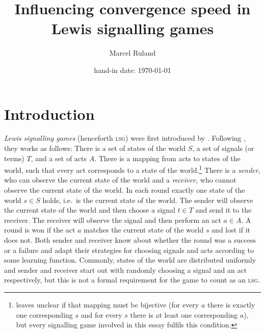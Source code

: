 \documentclass[
	DIV=calc,
	BCOR=0mm,
	pagesize,
]{scrartcl}
\title{Influencing convergence speed in Lewis signalling games}
\author{Marcel Ruland}
\date{hand-in date: \today}  %
\newcommand{\lsg}{\textsc{lsg}}
\begin{document}
\maketitle
\tableofcontents

\section{Introduction}
\label{sec:int}
\emph{Lewis signalling games} (henceforth \lsg) were first introduced by \citet{lewis_convention_1969}.
Following \citet[p.~530~ff.]{barrett_dynamic_2007}, they works as follows:
There is a set of states of the world \(S\), a set of signals (or terms) \(T\), and a set of acts \(A\).
There is a mapping from acts to states of the world, such that every act corresponds to a state of the world.\footnote{\citet{barrett_dynamic_2007} leaves unclear if that mapping must be bijective (for every \(a\) there is exactly one corresponding \(s\) and for every \(s\) there is at least one corresponding \(a\)), but every signalling game involved in this essay fulfils this condition.}
There is a \emph{sender}, who can observe the current state of the world and a \emph{receiver,} who cannot observe the current state of the world.
In each round exactly one state of the world \(s \in S\) holds, i.e.~is the current state of the world.
The sender will observe the current state of the world and then choose a signal \(t \in T\) and send it to the receiver.
The receiver will observe the signal and then perform an act \(a \in A\).
A round is won if the act \(a\) matches the current state of the world \(s\) and lost if it does not.
Both sender and receiver know about whether the round was a success or a failure and adapt their strategies for choosing signals and acts according to some learning function.
Commonly, states of the world are distributed uniformly and sender and receiver start out with randomly choosing a signal and an act respectively, but this is not a formal requirement for the game to count as an \lsg.
\end{document}
